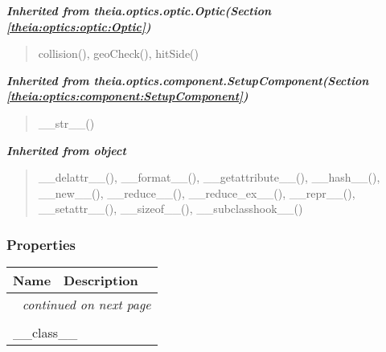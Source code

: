 \large{\textbf{\textit{Inherited from theia.optics.optic.Optic\textit{(Section \ref{theia:optics:optic:Optic})}}}}

\begin{quote}
collision(), geoCheck(), hitSide()
\end{quote}

\large{\textbf{\textit{Inherited from theia.optics.component.SetupComponent\textit{(Section \ref{theia:optics:component:SetupComponent})}}}}

\begin{quote}
\_\_str\_\_()
\end{quote}

\large{\textbf{\textit{Inherited from object}}}

\begin{quote}
\_\_delattr\_\_(), \_\_format\_\_(), \_\_getattribute\_\_(), \_\_hash\_\_(), \_\_new\_\_(), \_\_reduce\_\_(), \_\_reduce\_ex\_\_(), \_\_repr\_\_(), \_\_setattr\_\_(), \_\_sizeof\_\_(), \_\_subclasshook\_\_()
\end{quote}


  \subsubsection{Properties}

    \vspace{-1cm}
\hspace{\varindent}\begin{longtable}{|p{\varnamewidth}|p{\vardescrwidth}|l}
\cline{1-2}
\cline{1-2} \centering \textbf{Name} & \centering \textbf{Description}& \\
\cline{1-2}
\endhead\cline{1-2}\multicolumn{3}{r}{\small\textit{continued on next page}}\\\endfoot\cline{1-2}
\endlastfoot\multicolumn{2}{|l|}{\textit{Inherited from object}}\\
\multicolumn{2}{|p{\varwidth}|}{\raggedright \_\_class\_\_}\\
\cline{1-2}
\end{longtable}



